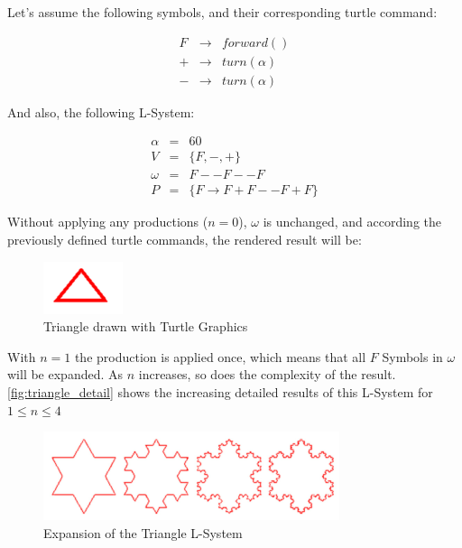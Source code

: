 \documentclass{acmtog}
\begin{document}
Let's assume the following symbols, and their corresponding turtle command:

\begin{eqnarray}
    F & \rightarrow &  forward()  \nonumber \\
    + & \rightarrow &  turn(\alpha)   \nonumber \\
    - & \rightarrow &  turn(\alpha)  \nonumber
\end{eqnarray}

And also, the following L-System:

\begin{eqnarray}
  \alpha  &=& 60                        \nonumber \\
  V       &=& \{F, -, +\}               \nonumber  \\
  \omega  &=& F--F--F                   \nonumber  \\
  P       &=& \{F \rightarrow F+F--F+F \}    \nonumber
\end{eqnarray}

Without applying any productions ($n=0$), $\omega$ is unchanged, and according the previously defined turtle commands, the rendered result will be:

\begin{figure}[!htp]
  \begin{center}
    \includegraphics{images/1_triangle}
    \caption{Triangle drawn with Turtle Graphics \label{fig:triangle}}
    \end{center}
\end{figure}

With $n=1$ the production is applied once, which means that all $F$ Symbols in $\omega$ will be expanded. As $n$ increases, so does the complexity of the result. \autoref{fig:triangle_detail} shows the increasing detailed results of this L-System for $1 \leq n \leq 4$

\begin{figure}[!htp]
  \begin{center}
    \includegraphics{images/2_triangle_detail}
    \caption{Expansion of the Triangle L-System \label{fig:triangle_detail}}
    \end{center}
\end{figure}
\end{document}
